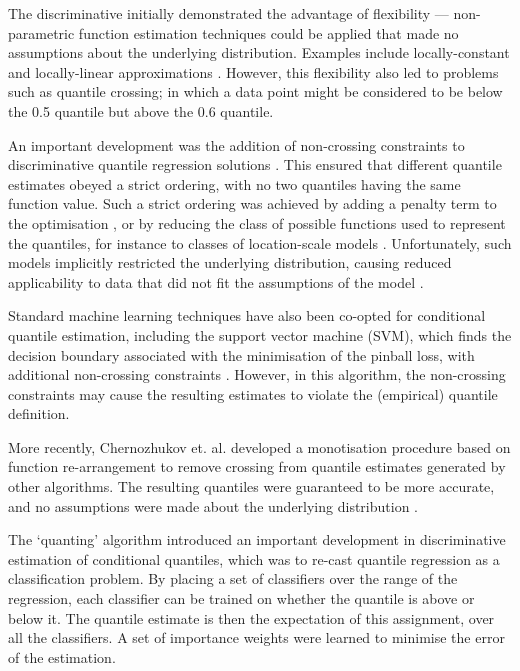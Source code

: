 \documentclass[twoside]{article} \usepackage{aistats2017}
\theoremstyle{definition}
\begin{document}
	The discriminative initially demonstrated the advantage of flexibility --- non-parametric function estimation techniques could be applied that made no assumptions about the underlying distribution. Examples include locally-constant and locally-linear approximations \citep{Chaudhuri1991, Yu1998}. However, this flexibility also led to problems such as quantile crossing; in which a data point might be considered to be below the 0.5 quantile but above the 0.6 quantile\cite{Koenker2005}. 
	
	An important development was the addition of non-crossing constraints to discriminative quantile regression solutions \citep{He1997}. This ensured that different quantile estimates obeyed a strict ordering, with no two quantiles having the same function value. Such a strict ordering was achieved by adding a penalty term to the optimisation \citep{Cole1992}, or by reducing the class of possible functions used to represent the quantiles, for instance to classes of location-scale models \citep{Koenker1984, He1997}. Unfortunately, such models implicitly restricted the underlying distribution, causing reduced applicability to data that did not fit the assumptions of the model \citep{Koenker2005}.
	
	Standard machine learning techniques have also been co-opted for conditional quantile estimation, including the support vector machine (SVM), which finds the decision boundary associated with the minimisation of the pinball loss, with additional non-crossing constraints \citep{Takeuchi2006}. However, in this algorithm, the non-crossing constraints may cause the resulting estimates to violate the (empirical) quantile definition.
	
	More recently, Chernozhukov et. al. developed a monotisation procedure based on function re-arrangement to remove crossing from quantile estimates generated by other algorithms. The resulting quantiles were guaranteed to be more accurate, and no assumptions were made about the underlying distribution \citep{Chernozhukov2010}.
	
	The `quanting' algorithm \citep{Langford2006} introduced an important development in discriminative estimation of conditional quantiles, which was to re-cast quantile regression as a classification problem. By placing a set of classifiers over the range of the regression, each classifier can be trained on whether the quantile is above or below it. The quantile estimate is then the expectation of this assignment, over all the classifiers.  A set of importance weights were learned to minimise the error of the estimation.
	
\end{document}
